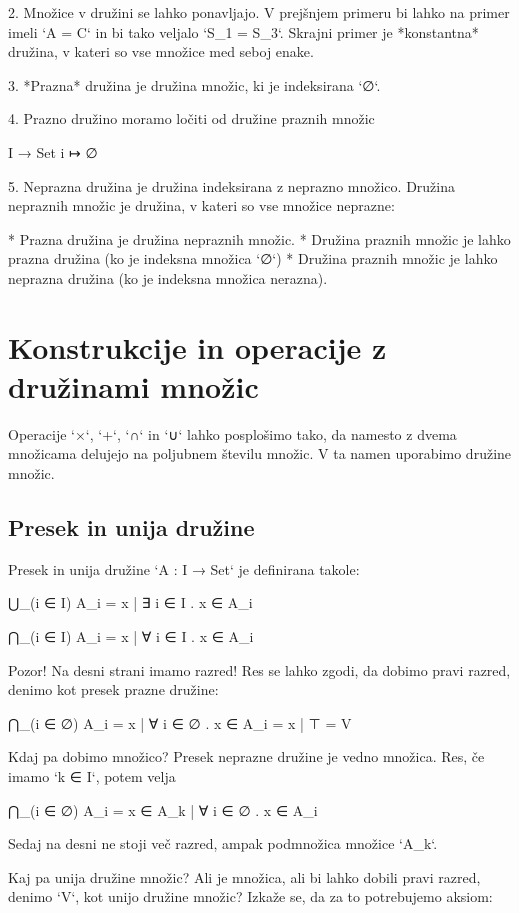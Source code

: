 2. Množice v družini se lahko ponavljajo. V prejšnjem primeru bi lahko na primer
   imeli `A = C` in bi tako veljalo `S_1 = S_3`. Skrajni primer je *konstantna* družina,
   v kateri so vse množice med seboj enake.

3. *Prazna* družina je družina množic, ki je indeksirana `∅`.

4. Prazno družino moramo ločiti od družine praznih množic

        I → Set
        i ↦ ∅

5. Neprazna družina je družina indeksirana z neprazno množico.
   Družina nepraznih množic je družina, v kateri so vse množice neprazne:

      * Prazna družina je družina nepraznih množic.
      * Družina praznih množic je lahko prazna družina (ko je indeksna množica `∅`)
      * Družina praznih množic je lahko neprazna družina (ko je indeksna množica nerazna).

\section{Konstrukcije in operacije z družinami množic}

Operacije `×`, `+`, `∩` in `∪` lahko posplošimo tako, da namesto z dvema
množicama delujejo na poljubnem številu množic. V ta namen uporabimo družine
množic.

\subsection{Presek in unija družine}

Presek in unija družine `A : I → Set` je definirana takole:

    ⋃_(i ∈ I) A_i = { x | ∃ i ∈ I . x ∈ A_i }

    ⋂_(i ∈ I) A_i = { x | ∀ i ∈ I . x ∈ A_i }

Pozor! Na desni strani imamo razred! Res se lahko zgodi, da dobimo pravi razred, denimo
kot presek prazne družine:

    ⋂_(i ∈ ∅) A_i = { x | ∀ i ∈ ∅ . x ∈ A_i } = { x | ⊤ } = V

Kdaj pa dobimo množico? Presek neprazne družine je vedno množica. Res, če imamo
`k ∈ I`, potem velja

    ⋂_(i ∈ ∅) A_i = { x ∈ A_k | ∀ i ∈ ∅ . x ∈ A_i }

Sedaj na desni ne stoji več razred, ampak podmnožica množice `A_k`.

Kaj pa unija družine množic? Ali je množica, ali bi lahko dobili pravi razred, denimo `V`,
kot unijo družine množic? Izkaže se, da za to potrebujemo aksiom:

